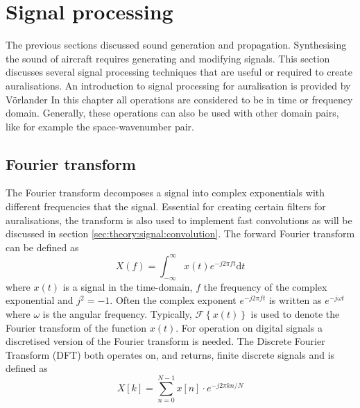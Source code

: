 \section{Signal processing}
The previous sections discussed sound generation and propagation. Synthesising
the sound of aircraft requires generating and modifying signals. This section
discusses several signal processing techniques that are useful or required to
create auralisations. An introduction to signal processing for auralisation is
provided by Vörlander \cite{Vorlander2008} In this chapter all operations are
considered to be in time or frequency domain. Generally, these operations can
also be used with other domain pairs, like for example the space-wavenumber
pair.

\subsection{Fourier transform}
The Fourier transform decomposes a signal into complex exponentials with
different frequencies that the signal. Essential for creating certain filters
for auralisations, the transform is also used to implement fast convolutions as
will be discussed in section \ref{sec:theory:signal:convolution}.
The forward Fourier transform can be defined as
\begin{equation}
 X(f) = \int_{-\infty}^{\infty} x(t) e^{-j 2 \pi f t} \mathrm{d} t
\end{equation}
where $x(t)$ is a signal in the time-domain, $f$ the frequency of the complex exponential and $j^2=-1$.
Often the complex exponent $e^{-j 2 \pi f t}$ is written as $e^{-j \omega t}$ where $\omega$ is the angular frequency.
Typically, $\mathcal{F} \left\{ x(t) \right\}$ is used to denote the Fourier transform of the function $x(t)$.
%
For operation on digital signals a discretised version of the
Fourier transform is needed. The Discrete Fourier Transform (DFT) both operates on, and
returns, finite discrete signals and is defined as
\begin{equation}
 X[k] = \sum_{n=0}^{N-1} x[n] \cdot e^{-j 2\pi k n / N}
\end{equation}
